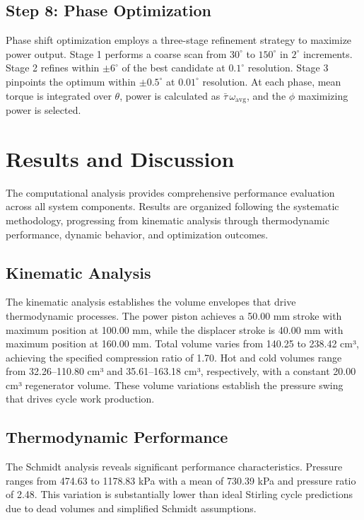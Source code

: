 \documentclass[12pt]{article}
\begin{document}
\subsection{Step 8: Phase Optimization}
Phase shift optimization employs a three-stage refinement strategy to maximize power output. Stage 1 performs a coarse scan from \(30^{\circ}\) to \(150^{\circ}\) in \(2^{\circ}\) increments. Stage 2 refines within \(\pm6^{\circ}\) of the best candidate at \(0.1^{\circ}\) resolution. Stage 3 pinpoints the optimum within \(\pm0.5^{\circ}\) at \(0.01^{\circ}\) resolution. At each phase, mean torque is integrated over \(\theta\), power is calculated as \(\bar{\tau}\,\omega_{\!\text{avg}}\), and the \(\phi\) maximizing power is selected.

\section{Results and Discussion}
The computational analysis provides comprehensive performance evaluation across all system components. Results are organized following the systematic methodology, progressing from kinematic analysis through thermodynamic performance, dynamic behavior, and optimization outcomes.

\subsection{Kinematic Analysis}
The kinematic analysis establishes the volume envelopes that drive thermodynamic processes. The power piston achieves a 50.00 mm stroke with maximum position at 100.00 mm, while the displacer stroke is 40.00 mm with maximum position at 160.00 mm. Total volume varies from 140.25 to 238.42 cm³, achieving the specified compression ratio of 1.70. Hot and cold volumes range from 32.26–110.80 cm³ and 35.61–163.18 cm³, respectively, with a constant 20.00 cm³ regenerator volume. These volume variations establish the pressure swing that drives cycle work production.

\subsection{Thermodynamic Performance}
The Schmidt analysis reveals significant performance characteristics. Pressure ranges from 474.63 to 1178.83 kPa with a mean of 730.39 kPa and pressure ratio of 2.48. This variation is substantially lower than ideal Stirling cycle predictions due to dead volumes and simplified Schmidt assumptions.
\end{document}
